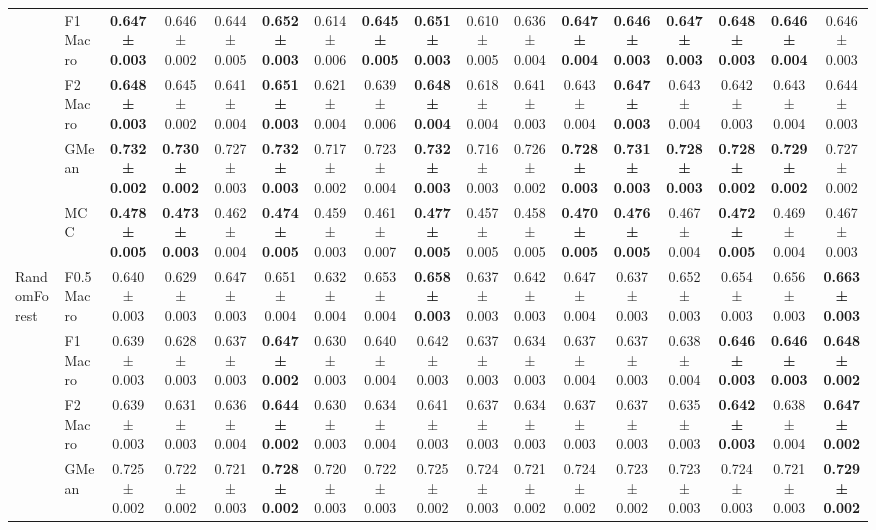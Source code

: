 \begin{table}[H]
{\begin{tabular}{llccccccccccccccc}
 & F1 Macro & \textbf{0.647 ± 0.003} & 0.646 ± 0.002 & 0.644 ± 0.005 & \textbf{0.652 ± 0.003} & 0.614 ± 0.006 & \textbf{0.645 ± 0.005} & \textbf{0.651 ± 0.003} & 0.610 ± 0.005 & 0.636 ± 0.004 & \textbf{0.647 ± 0.004} & \textbf{0.646 ± 0.003} & \textbf{0.647 ± 0.003} & \textbf{0.648 ± 0.003} & \textbf{0.646 ± 0.004} & 0.646 ± 0.003 \\
 & F2 Macro & \textbf{0.648 ± 0.003} & 0.645 ± 0.002 & 0.641 ± 0.004 & \textbf{0.651 ± 0.003} & 0.621 ± 0.004 & 0.639 ± 0.006 & \textbf{0.648 ± 0.004} & 0.618 ± 0.004 & 0.641 ± 0.003 & 0.643 ± 0.004 & \textbf{0.647 ± 0.003} & 0.643 ± 0.004 & 0.642 ± 0.003 & 0.643 ± 0.004 & 0.644 ± 0.003 \\
 & GMean & \textbf{0.732 ± 0.002} & \textbf{0.730 ± 0.002} & 0.727 ± 0.003 & \textbf{0.732 ± 0.003} & 0.717 ± 0.002 & 0.723 ± 0.004 & \textbf{0.732 ± 0.003} & 0.716 ± 0.003 & 0.726 ± 0.002 & \textbf{0.728 ± 0.003} & \textbf{0.731 ± 0.003} & \textbf{0.728 ± 0.003} & \textbf{0.728 ± 0.002} & \textbf{0.729 ± 0.002} & 0.727 ± 0.002 \\
 & MCC & \textbf{0.478 ± 0.005} & \textbf{0.473 ± 0.003} & 0.462 ± 0.004 & \textbf{0.474 ± 0.005} & 0.459 ± 0.003 & 0.461 ± 0.007 & \textbf{0.477 ± 0.005} & 0.457 ± 0.005 & 0.458 ± 0.005 & \textbf{0.470 ± 0.005} & \textbf{0.476 ± 0.005} & 0.467 ± 0.004 & \textbf{0.472 ± 0.005} & 0.469 ± 0.004 & 0.467 ± 0.003 \\
\cline{1-17}
\multirow[t]{5}{*}{RandomForest} & F0.5 Macro & 0.640 ± 0.003 & 0.629 ± 0.003 & 0.647 ± 0.003 & 0.651 ± 0.004 & 0.632 ± 0.004 & 0.653 ± 0.004 & \textbf{0.658 ± 0.003} & 0.637 ± 0.003 & 0.642 ± 0.003 & 0.647 ± 0.004 & 0.637 ± 0.003 & 0.652 ± 0.003 & 0.654 ± 0.003 & 0.656 ± 0.003 & \textbf{0.663 ± 0.003} \\
 & F1 Macro & 0.639 ± 0.003 & 0.628 ± 0.003 & 0.637 ± 0.003 & \textbf{0.647 ± 0.002} & 0.630 ± 0.003 & 0.640 ± 0.004 & 0.642 ± 0.003 & 0.637 ± 0.003 & 0.634 ± 0.003 & 0.637 ± 0.004 & 0.637 ± 0.003 & 0.638 ± 0.004 & \textbf{0.646 ± 0.003} & \textbf{0.646 ± 0.003} & \textbf{0.648 ± 0.002} \\
 & F2 Macro & 0.639 ± 0.003 & 0.631 ± 0.003 & 0.636 ± 0.004 & \textbf{0.644 ± 0.002} & 0.630 ± 0.003 & 0.634 ± 0.004 & 0.641 ± 0.003 & 0.637 ± 0.003 & 0.634 ± 0.003 & 0.637 ± 0.003 & 0.637 ± 0.003 & 0.635 ± 0.003 & \textbf{0.642 ± 0.003} & 0.638 ± 0.004 & \textbf{0.647 ± 0.002} \\
 & GMean & 0.725 ± 0.002 & 0.722 ± 0.002 & 0.721 ± 0.003 & \textbf{0.728 ± 0.002} & 0.720 ± 0.003 & 0.722 ± 0.003 & 0.725 ± 0.002 & 0.724 ± 0.003 & 0.721 ± 0.002 & 0.724 ± 0.002 & 0.723 ± 0.002 & 0.723 ± 0.003 & 0.724 ± 0.003 & 0.721 ± 0.003 & \textbf{0.729 ± 0.002} \\

\end{tabular}}
\end{table}
